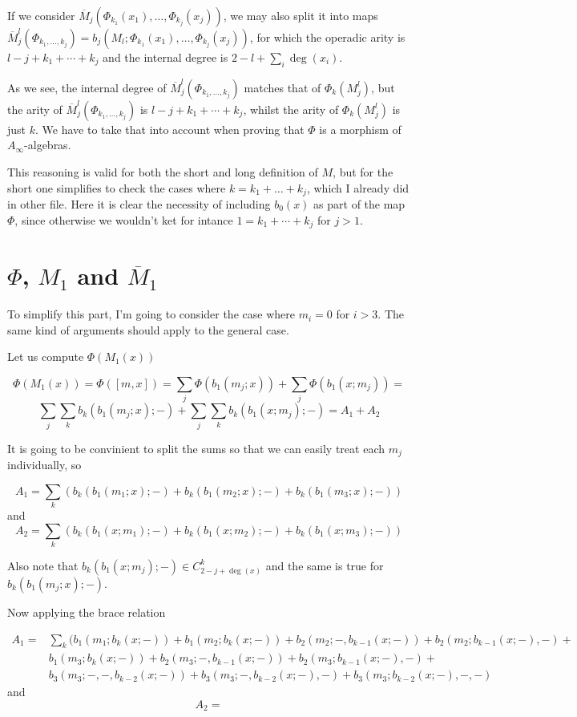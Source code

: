 \documentclass[twoside]{article}
\begin{document}
If we consider $\overline{M}_j(\Phi_{k_1}(x_1),\dots, \Phi_{k_j}(x_j))$, we may also split it into maps $\overline{M}_j^l(\Phi_{k_1,\dots, k_j})=b_j(M_l;\Phi_{k_1}(x_1),\dots, \Phi_{k_j}(x_j))$, for which the operadic arity is $l-j+k_1+\cdots+k_j$ and the internal degree is $2-l+\sum_i\deg(x_i)$. 

As we see, the internal degree of $\overline{M}_j^l(\Phi_{k_1,\dots, k_j})$ matches that of $\Phi_k(M_j^l)$, but the arity of $\overline{M}_j^l(\Phi_{k_1,\dots, k_j})$ is $l-j+k_1+\cdots+k_j$, whilst the arity of $\Phi_k(M_j^l)$ is just $k$. We have to take that into account when proving that $\Phi$ is a morphism of $A_\infty$-algebras.

This reasoning is valid for both the short and long definition of $M$, but for the short one simplifies to check the cases where $k=k_1+\dots+k_j$, which I already did in other file. Here it is clear the necessity of including $b_0(x)$ as part of the map $\Phi$, since otherwise we wouldn't ket for intance $1=k_1+\cdots+k_j$ for $j>1$. 

\section{$\Phi$, $M_1$ and $\overline{M}_1$}

To simplify this part, I'm going to consider the case where $m_i=0$ for $i>3$. The same kind of arguments should apply to the general case.

Let us compute $\Phi(M_1(x))$ 

$$\Phi(M_1(x))=\Phi([m,x])=\sum_j\Phi(b_1(m_j;x))+\sum_j\Phi(b_1(x;m_j))=$$
$$\sum_j\sum_k b_k(b_1(m_j;x);-)+\sum_j\sum_k b_k(b_1(x;m_j);-)=A_1+A_2$$

It is going to be convinient to split the sums so that we can easily treat each $m_j$ individually, so

$$A_1=\sum_k (b_k(b_1(m_1;x);-)+b_k(b_1(m_2;x);-)+b_k(b_1(m_3;x);-))$$
and
$$A_2=\sum_k (b_k(b_1(x;m_1);-)+b_k(b_1(x;m_2);-)+b_k(b_1(x;m_3);-))$$

Also note that $b_k(b_1(x;m_j);-)\in C^k_{2-j+\deg(x)}$ and the same is true for $b_k(b_1(m_j;x);-)$.

Now applying the brace relation

\begin{align*}
A_1=&\sum_k ( b_1(m_1;b_k(x;-))+b_1(m_2;b_k(x;-))+b_2(m_2;-,b_{k-1}(x;-))+b_2(m_2;b_{k-1}(x;-),-)+\\
&b_1(m_3;b_k(x;-))+b_2(m_3;-,b_{k-1}(x;-))+b_2(m_3;b_{k-1}(x;-),-)+\\
& b_3(m_3;-,-,b_{k-2}(x;-))+b_3(m_3;-,b_{k-2}(x;-),-)+b_3(m_3;b_{k-2}(x;-),-,-)
\end{align*}
and
$$A_2=$$
\end{document}
